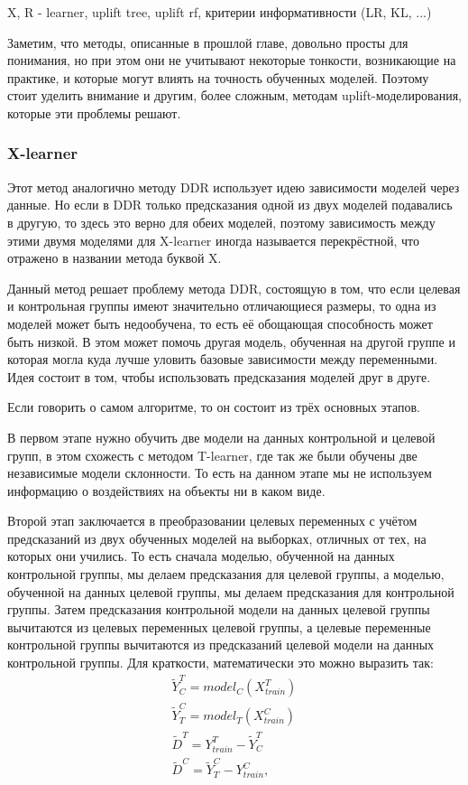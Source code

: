 X, R - learner, uplift tree, uplift rf, критерии информативности (LR, KL, ...)

Заметим, что методы, описанные в прошлой главе, довольно просты для понимания, но при этом они не учитывают некоторые тонкости, возникающие на практике, и которые могут влиять на точность обученных моделей. Поэтому стоит уделить внимание и другим, более сложным, методам uplift-моделирования, которые эти проблемы решают.

\subsubsection*{X-learner}

Этот метод аналогично методу DDR использует идею зависимости моделей через данные. Но если в DDR только предсказания одной из двух моделей подавались в другую, то здесь это верно для обеих моделей, поэтому зависимость между этими двумя моделями для X-learner иногда называется перекрёстной, что отражено в названии метода буквой X.

Данный метод решает проблему метода DDR, состоящую в том, что если целевая и контрольная группы имеют значительно отличающиеся размеры, то одна из моделей может быть недообучена, то есть её обощающая способность может быть низкой. В этом может помочь другая модель, обученная на другой группе и которая могла куда лучше уловить базовые зависимости между переменными. Идея состоит в том, чтобы использовать предсказания моделей друг в друге.

Если говорить о самом алгоритме, то он состоит из трёх основных этапов.

В первом этапе нужно обучить две модели на данных контрольной и целевой групп, в этом схожесть с методом T-learner, где так же были обучены две независимые модели склонности. То есть на данном этапе мы не используем информацию о воздействиях на объекты ни в каком виде.

Второй этап заключается в преобразовании целевых переменных с учётом предсказаний из двух обученных моделей на выборках, отличных от тех, на которых они учились. То есть сначала моделью, обученной на данных контрольной группы, мы делаем предсказания для целевой группы, а моделью, обученной на данных целевой группы, мы делаем предсказания для контрольной группы. Затем предсказания контрольной модели на данных целевой группы вычитаются из целевых переменных целевой группы, а целевые переменные контрольной группы вычитаются из предсказаний целевой модели на данных контрольной группы. Для краткости, математически это можно выразить так:
\begin{gather*}
    \widetilde{Y}^T_C = model_C(X_{train}^T) \\
    \widetilde{Y}^C_T = model_T(X_{train}^C) \\
    \widetilde{D}^T = Y_{train}^T - \widetilde{Y}^T_C \\
    \widetilde{D}^C = \widetilde{Y}^C_T - Y_{train}^C,
\end{gather*}

